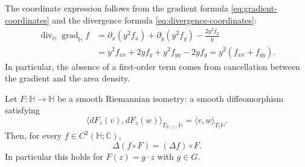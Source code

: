 The coordinate expression follows from the gradient formula \eqref{eq:gradient-coordinates} and the divergence formula \eqref{eq:divergence-coordinates}:
\[
 \begin{aligned}
 \operatorname{div}_{\mathbb H}\operatorname{grad}_{\mathbb H}f
 &=\partial_x(y^2f_x)+\partial_y(y^2f_y)-\frac{2y^2f_y}{y}\\
 &=y^2f_{xx}+2yf_y+y^2f_{yy}-2yf_y
 =y^2(f_{xx}+f_{yy}).
 \end{aligned}
\]
In particular, the absence of a first-order term comes from cancellation between the gradient and the area density.

\begin{theorem}\label{hyperbolic.laplacian-isometries}
Let $F:\mathbb H\to\mathbb H$ be a smooth Riemannian isometry: a smooth diffeomorphism satisfying
\[
 \langle dF_z(v),dF_z(w)\rangle_{T_{F(z)}\mathbb H}
 =\langle v,w\rangle_{T_z\mathbb H}.
\]
Then, for every $f\in C^2(\mathbb H;\mathbb C)$,
\[
 \Delta(f\circ F)=(\Delta f)\circ F.
\]
In particular this holds for $F(z)=g\cdot z$ with $g\in G$.
\end{theorem}

